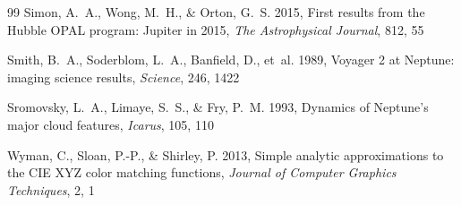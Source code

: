 \documentclass[11pt,a4paper]{article}
\begin{document}
{\begin{thebibliography}{99}
Simon, A.~A., Wong, M.~H., \& Orton, G.~S. 2015, First results from the Hubble OPAL program:
Jupiter in 2015, \textit{The Astrophysical Journal}, 812, 55

Smith, B.~A., Soderblom, L.~A., Banfield, D., et~al. 1989, Voyager 2 at Neptune: imaging science
results, \textit{Science}, 246, 1422

Sromovsky, L.~A., Limaye, S.~S., \& Fry, P.~M. 1993, Dynamics of Neptune's major cloud features,
\textit{Icarus}, 105, 110

Wyman, C., Sloan, P.-P., \& Shirley, P. 2013, Simple analytic approximations to the CIE XYZ color
matching functions, \textit{Journal of Computer Graphics Techniques}, 2, 1
\end{thebibliography}
}
\end{document}
